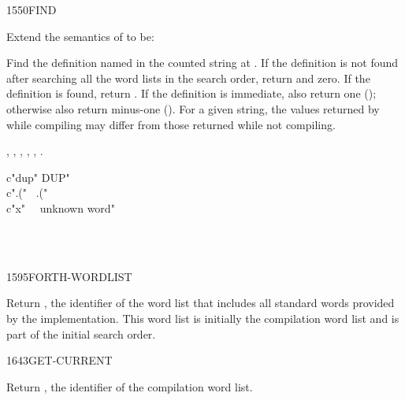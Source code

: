 \begin{worddef}{1550}{FIND}
\item Extend the semantics of  to be:


	Find the definition named in the counted string at .
	If the definition is not found after searching all the word lists
	in the search order, return  and zero. If
	the definition is found, return . If the definition is
	immediate, also return one (); otherwise also return
	minus-one (). For a given string, the values returned
	by  while compiling may differ from those returned
	while not compiling.

\see {},
	,
	,
	,
	,
	.

	\begin{testing}\ttfamily
	\cbstart{}
		\word{:} c"dup"  DUP" \word{;} \\
		\word{:} c".("~  .("~ \word{;} \\
		\word{:} c"x"~~  unknown word" \word{;}

		 \\
		 \\
	\cbend
	\end{testing}
\end{worddef}


\begin{worddef}{1595}{FORTH-WORDLIST}
\item {}

	Return , the identifier of the word list that includes
	all standard words provided by the implementation. This word list
	is initially the compilation word list and is part of the initial
	search order.

	\begin{testing}
	\cbstart{}
	\cbend
	\end{testing}
\end{worddef}


\begin{worddef}{1643}{GET-CURRENT}
\item {}

	Return , the identifier of the compilation word list.
\end{worddef}


